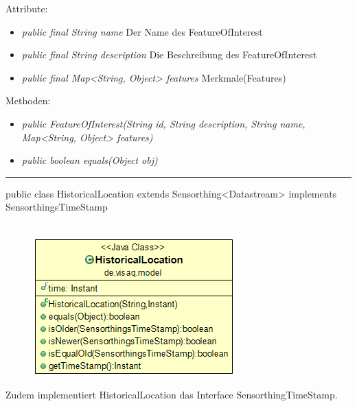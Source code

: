 Attribute:
\begin{itemize}
	\item \emph{public final String name} Der Name des FeatureOfInterest
	\item \emph{public final String description} Die Beschreibung des FeatureOfInterest
	\item \emph{public final Map<String, Object> features} Merkmale(Features)
\end{itemize}
Methoden:
\begin{itemize}
	\item \emph{public FeatureOfInterest(String id, String description, String name, Map<String, Object> features)} 
	\item \emph{public boolean equals(Object obj)} 
\end{itemize}

\rule{\textwidth}{0.4pt}
public class HistoricalLocation extends Sensorthing<Datastream> implements SensorthingsTimeStamp
\\\\
\begin{minipage}{0.3\textwidth}
	\begin{figure}[H]
		\includegraphics[scale = 0.5
		]{media/frontend/model/HistoricalLocationClass.png}
	\end{figure}
\end{minipage} \hfill
\begin{minipage}{0.6\textwidth}
	 Zudem implementiert HistoricalLocation das Interface SensorthingTimeStamp.
\end{minipage}

